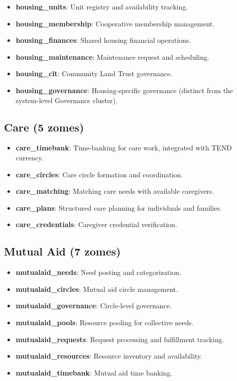 \documentclass[12pt]{book}
\begin{document}
\begin{itemize}
  \item \textbf{housing\_units}: Unit registry and availability tracking.
  \item \textbf{housing\_membership}: Cooperative membership management.
  \item \textbf{housing\_finances}: Shared housing financial operations.
  \item \textbf{housing\_maintenance}: Maintenance request and scheduling.
  \item \textbf{housing\_clt}: Community Land Trust governance.
  \item \textbf{housing\_governance}: Housing-specific governance (distinct from
    the system-level Governance cluster).
\end{itemize}

\subsection{Care (5 zomes)}

\begin{itemize}
  \item \textbf{care\_timebank}: Time-banking for care work, integrated with
    TEND currency.
  \item \textbf{care\_circles}: Care circle formation and coordination.
  \item \textbf{care\_matching}: Matching care needs with available caregivers.
  \item \textbf{care\_plans}: Structured care planning for individuals and families.
  \item \textbf{care\_credentials}: Caregiver credential verification.
\end{itemize}

\subsection{Mutual Aid (7 zomes)}

\begin{itemize}
  \item \textbf{mutualaid\_needs}: Need posting and categorization.
  \item \textbf{mutualaid\_circles}: Mutual aid circle management.
  \item \textbf{mutualaid\_governance}: Circle-level governance.
  \item \textbf{mutualaid\_pools}: Resource pooling for collective needs.
  \item \textbf{mutualaid\_requests}: Request processing and fulfillment tracking.
  \item \textbf{mutualaid\_resources}: Resource inventory and availability.
  \item \textbf{mutualaid\_timebank}: Mutual aid time banking.
\end{itemize}
\end{document}
